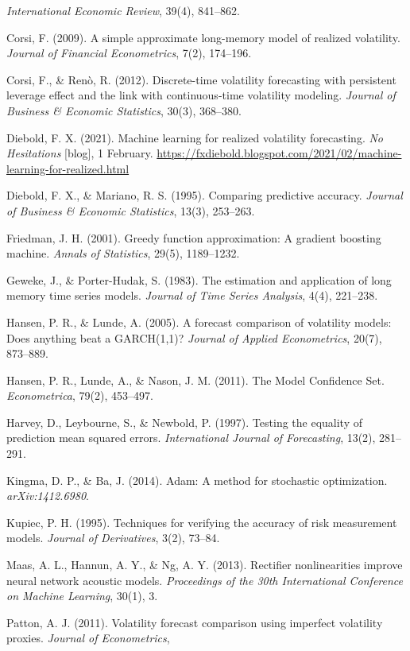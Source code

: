 \documentclass[twocolumn,9pt]{extarticle}
\begin{document}
\textit{International Economic Review}, 39(4), 841--862.\par
Corsi, F. (2009). A simple approximate long-memory model of
realized volatility. \textit{Journal of Financial Econometrics},
7(2), 174--196.\par
Corsi, F., \& Renò, R. (2012). Discrete-time volatility forecasting
with persistent leverage effect and the link with continuous-time
volatility modeling. \textit{Journal of Business \& Economic
Statistics}, 30(3), 368--380.\par
Diebold, F. X. (2021). Machine learning for realized volatility
forecasting. \textit{No Hesitations} [blog], 1 February.
\url{https://fxdiebold.blogspot.com/2021/02/machine-learning-for-realized.html}\par
Diebold, F. X., \& Mariano, R. S. (1995). Comparing predictive
accuracy. \textit{Journal of Business \& Economic Statistics},
13(3), 253--263.\par
Friedman, J. H. (2001). Greedy function approximation: A gradient
boosting machine. \textit{Annals of Statistics}, 29(5),
1189--1232.\par
Geweke, J., \& Porter-Hudak, S. (1983). The estimation and
application of long memory time series models. \textit{Journal of
Time Series Analysis}, 4(4), 221--238.\par
Hansen, P. R., \& Lunde, A. (2005). A forecast comparison of
volatility models: Does anything beat a GARCH(1,1)?
\textit{Journal of Applied Econometrics}, 20(7), 873--889.\par
Hansen, P. R., Lunde, A., \& Nason, J. M. (2011). The Model
Confidence Set. \textit{Econometrica}, 79(2), 453--497.\par
Harvey, D., Leybourne, S., \& Newbold, P. (1997). Testing the
equality of prediction mean squared errors. \textit{International
Journal of Forecasting}, 13(2), 281--291.\par
Kingma, D. P., \& Ba, J. (2014). Adam: A method for stochastic
optimization. \textit{arXiv:1412.6980}.\par
Kupiec, P. H. (1995). Techniques for verifying the accuracy of risk
measurement models. \textit{Journal of Derivatives}, 3(2),
73--84.\par
Maas, A. L., Hannun, A. Y., \& Ng, A. Y. (2013). Rectifier
nonlinearities improve neural network acoustic models.
\textit{Proceedings of the 30th International Conference on Machine
Learning}, 30(1), 3.\par
Patton, A. J. (2011). Volatility forecast comparison using
imperfect volatility proxies. \textit{Journal of Econometrics},
\end{document}
